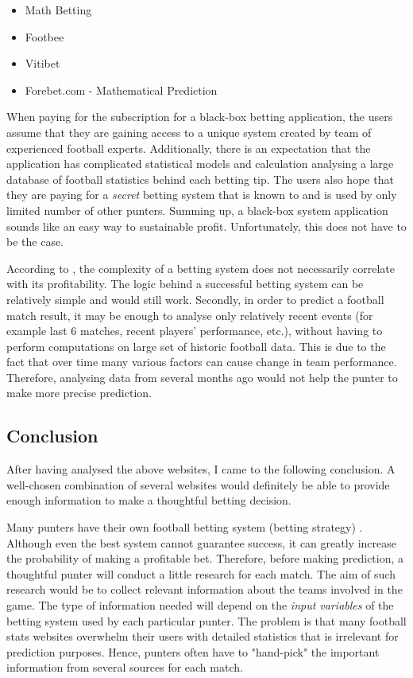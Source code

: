\begin{itemize}
	\item Math Betting \citep{source:mathbetting}
	\item Footbee \citep{source:footbee}
	\item Vitibet \citep{source:vitibet}
	\item Forebet.com - Mathematical Prediction \citep{source:forebet}
\end{itemize}

When paying for the subscription for a black-box betting application, the users assume that they are gaining access to a unique system created by team of experienced football experts. Additionally, there is an expectation that the application has complicated statistical models and calculation analysing a large database of football statistics behind each betting tip. The users also hope that they are paying for a \emph{secret} betting system that is known to and is used by only limited number of other punters. Summing up, a black-box system application sounds like an easy way to sustainable profit. Unfortunately, this does not have to be the case.

According to \citet{art:simplebettingsystem}, the complexity of a betting system does not necessarily correlate with its profitability. The logic behind a successful betting system can be relatively simple and would still work. Secondly, in order to predict a football match result, it may be enough to analyse only relatively recent events (for example last 6 matches, recent players' performance, etc.), without having to perform computations on large set of historic football data. This is due to the fact that over time many various factors can cause change in team performance. Therefore, analysing data from several months ago would not help the punter to make more precise prediction.

\subsection{Conclusion}
After having analysed the above websites, I came to the following conclusion. A well-chosen combination of several websites would definitely be able to provide enough information to make a thoughtful betting decision.

Many punters have their own football betting system (betting strategy) \citep{art:simplebettingsystem}. Although even the best system cannot guarantee success, it can greatly increase the probability of making a profitable bet. Therefore, before making prediction, a thoughtful punter will conduct a little research for each match. The aim of such research would be to collect relevant information about the teams involved in the game. The type of information needed will depend on the \emph{input variables} of the betting system used by each particular punter. The problem is that many football stats websites overwhelm their users with detailed statistics that is irrelevant for prediction purposes. Hence, punters often have to "hand-pick" the important information from several sources for each match.
	
